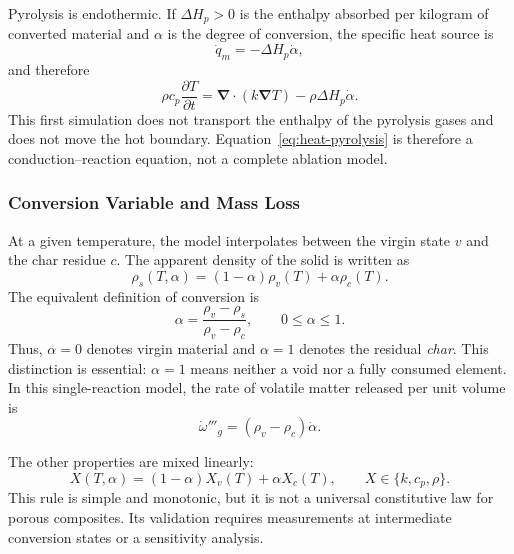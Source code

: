 \documentclass[oneside,openany]{amsdtx}
\newcommand{\pd}{\partial}
\newcommand{\vect}[1]{\bm{#1}}
\begin{document}
Pyrolysis is endothermic. If \(\Delta H_p>0\) is the enthalpy absorbed per
kilogram of converted material and \(\alpha\) is the degree of conversion, the
specific heat source is
\begin{equation}
  \dot q_m=-\Delta H_p\dot\alpha,
\end{equation}
and therefore
\begin{equation}
  \boxed{\rho c_p\frac{\pd T}{\pd t}
  =\vect\nabla\cdot(k\vect\nabla T)
  -\rho\Delta H_p\dot\alpha.}
  \label{eq:heat-pyrolysis}
\end{equation}
This first simulation does not transport the enthalpy of the pyrolysis gases
and does not move the hot boundary. Equation~\eqref{eq:heat-pyrolysis} is
therefore a conduction--reaction equation, not a complete ablation model.

\subsubsection{Conversion Variable and Mass Loss}

At a given temperature, the model interpolates between the virgin state \(v\)
and the char residue \(c\). The apparent density of the solid is written as
\begin{equation}
  \rho_s(T,\alpha)=(1-\alpha)\rho_v(T)+\alpha\rho_c(T).
  \label{eq:density-mix}
\end{equation}
The equivalent definition of conversion is
\begin{equation}
  \alpha=\frac{\rho_v-\rho_s}{\rho_v-\rho_c},\qquad 0\le\alpha\le1.
  \label{eq:alpha-density}
\end{equation}
Thus, \(\alpha=0\) denotes virgin material and \(\alpha=1\) denotes the
residual \emph{char}. This distinction is essential: \(\alpha=1\) means neither
a void nor a fully consumed element. In this single-reaction model, the rate of
volatile matter released per unit volume is
\begin{equation}
  \dot\omega'''_g=(\rho_v-\rho_c)\dot\alpha.
  \label{eq:gas-source}
\end{equation}

The other properties are mixed linearly:
\begin{equation}
  X(T,\alpha)=(1-\alpha)X_v(T)+\alpha X_c(T),
  \qquad X\in\{k,c_p,\rho\}.
  \label{eq:mix-rule}
\end{equation}
This rule is simple and monotonic, but it is not a universal constitutive law
for porous composites. Its validation requires measurements at intermediate
conversion states or a sensitivity analysis.
\end{document}
